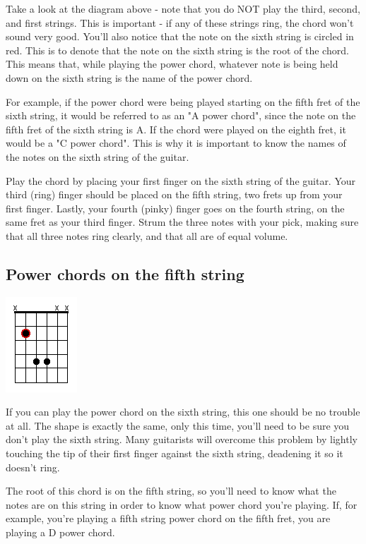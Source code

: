 Take a look at the diagram above - note that you do NOT play the third, second, and first strings. This is important - if any of these strings ring, the chord won't sound very good. You'll also notice that the note on the sixth string is circled in red. This is to denote that the note on the sixth string is the root of the chord. This means that, while playing the power chord, whatever note is being held down on the sixth string is the name of the power chord.

For example, if the power chord were being played starting on the fifth fret of the sixth string, it would be referred to as an "A power chord", since the note on the fifth fret of the sixth string is A. If the chord were played on the eighth fret, it would be a "C power chord". This is why it is important to know the names of the notes on the sixth string of the guitar.

Play the chord by placing your first finger on the sixth string of the guitar. Your third (ring) finger should be placed on the fifth string, two frets up from your first finger. Lastly, your fourth (pinky) finger goes on the fourth string, on the same fret as your third finger. Strum the three notes with your pick, making sure that all three notes ring clearly, and that all are of equal volume.

\subsection{Power chords on the fifth string}
\includegraphics{partfour/powerchord5.png}

If you can play the power chord on the sixth string, this one should be no trouble at all. The shape is exactly the same, only this time, you'll need to be sure you don't play the sixth string. Many guitarists will overcome this problem by lightly touching the tip of their first finger against the sixth string, deadening it so it doesn't ring.

The root of this chord is on the fifth string, so you'll need to know what the notes are on this string in order to know what power chord you're playing. If, for example, you're playing a fifth string power chord on the fifth fret, you are playing a D power chord.

